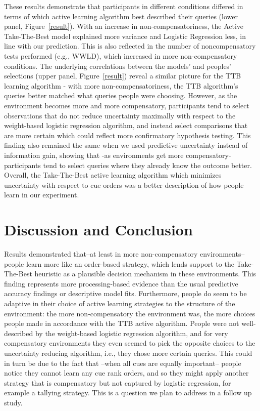 \documentclass[10pt,letterpaper]{article}
\begin{document}
 These results demonstrate that participants in different conditions differed in terms of which active learning algorithm best described their queries (lower panel, Figure~\ref{result}).  With an increase in non-compensatoriness, the Active Take-The-Best model explained more variance and Logistic Regression less, in line with our prediction. This is also reflected in the number of noncompensatory tests performed (e.g., WWLD), which increased in more non-compensatory conditions. The underlying correlations between the models' and peoples' selections (upper panel, Figure~\ref{result}) reveal a similar picture for the TTB learning algorithm - with more non-compensatoriness, the TTB algorithm's queries better matched what queries people were choosing. However, as the environment becomes more and more compensatory, participants tend to select observations that do not reduce uncertainty maximally with respect to the weight-based logistic regression algorithm, and instead select comparisons that are more certain which could reflect more confirmatory hypothesis testing. This finding also remained the same when we used predictive uncertainty instead of information gain, showing that -as environments get more compensatory- participants tend to select queries where they already know the outcome better. Overall, the Take-The-Best active learning algorithm which minimizes uncertainty with respect to cue orders was a better description of how people learn in our experiment.
\section{Discussion and Conclusion}
Results demonstrated that--at least in more non-compensatory environments-- people learn more like an order-based strategy, which lends support to the Take-The-Best heuristic as a plausible decision mechanism in these environments. This finding represents more processing-based evidence than the usual predictive accuracy findings or descriptive model fits.  Furthermore, people do seem to be adaptive in their choice of active learning strategies to the structure of the environment: the more non-compensatory the environment was, the more choices people made in accordance with the TTB active algorithm. People were not well-described by the weight-based logistic regression algorithm, and for very compensatory environments they even seemed to pick the opposite choices to the uncertainty reducing algorithm, i.e., they chose more certain queries. This could in turn be due to the fact that --when all cues are equally important-- people notice they cannot learn any cue rank orders, and so they might apply another strategy that is compensatory but not captured by logistic regression, for example a tallying strategy. This is a question we plan to address in a follow up study.\\
\end{document}
